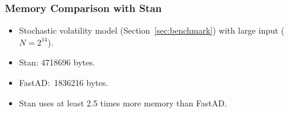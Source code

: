 \begin{frame}
\frametitle{Memory Comparison with Stan}
\begin{itemize}

\item Stochastic volatility model (Section~\ref{sec:benchmark})
    with large input ($N = 2^{14}$).
\item Stan: 4718696 bytes.
\item FastAD:\ 1836216 bytes.
\item Stan uses at least 2.5 times more memory than FastAD.\@

\end{itemize}
\end{frame}
